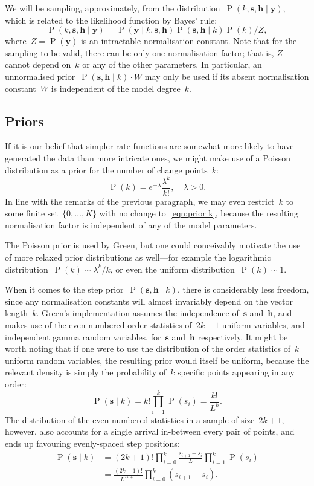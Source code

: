 \documentclass[11pt,a4paper]{article}
\newcommand\ub[1]{\symbf{#1}}                    %
\DeclareMathOperator\Pb{P}                       %
\theoremstyle{definition}
\begin{document}
We will be sampling, approximately, from the distribution~$\Pb(k,\ub{s}, \ub{h}
\mid \ub{y})$, which is related to the likelihood function by Bayes' rule:
\[ \Pb(k,\ub{s},\ub{h} \mid \ub{y})
  = \Pb(\ub{y} \mid k,\ub{s},\ub{h}) \Pb(\ub{s},\ub{h} \mid k) \Pb(k) / Z, \]
where~$Z = \Pb(\ub{y})$ is an intractable normalisation constant. Note that for
the sampling to be valid, there can be only one normalisation factor; that is,
$Z$ cannot depend on~$k$ or any of the other parameters. In particular, an
unnormalised prior~$\Pb(\ub{s},\ub{h} \mid k) \cdot W$ may only be used if its
absent normalisation constant~$W$ is independent of the model degree~$k$.

\subsection{Priors} %

If it is our belief that simpler rate functions are somewhat more likely to have
generated the data than more intricate ones, we might make use of a Poisson
distribution as a prior for the number of change points~$k$:
\begin{equation}\label{eqn:prior k}
  \Pb(k) = e^{-\lambda} \frac{\lambda^k}{k!}, \quad \lambda > 0.
\end{equation}
In line with the remarks of the previous paragraph, we may even restrict~$k$ to
some finite set~$\{0,\dots,K\}$ with no change to~\eqref{eqn:prior k}, because
the resulting normalisation factor is independent of any of the model
parameters.

The Poisson prior is used by Green, but one could conceivably motivate the use
of more relaxed prior distributions as well---for example the logarithmic
distribution~$\Pb(k) \sim \lambda^k/k$, or even the uniform distribution~$\Pb(k)
\sim 1$.

When it comes to the step prior~$\Pb(\ub{s},\ub{h} \mid k)$, there is
considerably less freedom, since any normalisation constants will almost
invariably depend on the vector length~$k$. Green's implementation assumes the
independence of~$\ub{s}$ and~$\ub{h}$, and makes use of the even-numbered order
statistics of~$2k+1$ uniform variables, and independent gamma random variables,
for~$\ub{s}$ and~$\ub{h}$ respectively. It might be worth noting that if one
were to use the distribution of the order statistics of~$k$ uniform random
variables, the resulting prior would itself be uniform, because the relevant
density is simply the probability of~$k$ specific points appearing in any order:
\[ \Pb(\ub{s} \mid k) = k! \prod_{i=1}^k \Pb(s_i) = \frac{k!}{L^k}. \]
The distribution of the even-numbered statistics in a sample of size~$2k+1$,
however, also accounts for a single arrival in-between every pair of points, and
ends up favouring evenly-spaced step positions:
\begin{align}\label{eqn:prior s}
  \Pb(\ub{s} \mid k) &= (2k+1)! \prod_{i=0}^k \frac{s_{i+1} - s_i}{L}
      \prod_{i=1}^k \Pb(s_i) \nonumber \\
    &= \frac{(2k+1)!}{L^{2k+1}} \prod_{i=0}^k (s_{i+1} - s_i).
\end{align}
\end{document}
